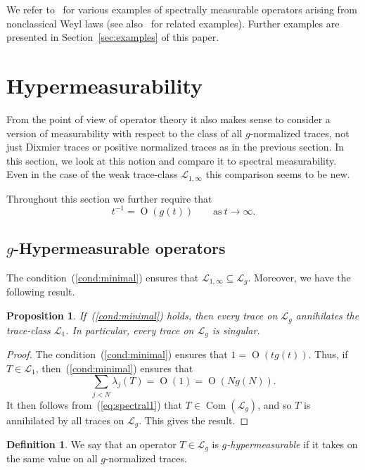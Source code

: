 \documentclass[10pt, a4paper]{amsart}
\newcommand{\sL}{\mathscr{L}}
\newcommand{\op}{\operatorname}
\newcommand{\Com}{\op{Com}}
\numberwithin{equation}{section}
\newtheorem{proposition}[theorem]{Proposition}
\theoremstyle{definition}
\newtheorem{definition}[theorem]{Definition}
\theoremstyle{remark}
\begin{document}
We refer to~\cite{PT:Part1} for various examples of spectrally measurable operators arising from nonclassical Weyl laws (see also~\cite{GS:JFA14, GU:JMAA20, LU:JMAA25, McD:arXiv26, TU:JMAA27} for related examples). Further examples are presented in Section~\ref{sec:examples} of this paper. 

\section{Hypermeasurability}\label{sec:hypermeasurability}
From the point of view of operator theory it also makes sense to consider a version of measurability with respect to the class of all $g$-normalized traces, not just Dixmier traces or positive normalized traces as in the previous section. In this section, we look at this notion and compare it to spectral measurability. Even in the case of the weak trace-class $\sL_{1,\infty}$ this comparison seems to be new.

Throughout this section we further require that
\begin{equation}\label{cond:minimal}
 t^{-1}=\op{O}\left(g(t)\right) \qquad \text{as}\ t\rightarrow \infty.
\end{equation}

\subsection{$g$-Hypermeasurable operators}
The condition~(\ref{cond:minimal}) ensures that $\sL_{1,\infty}\subseteq \sL_g$. Moreover, we have the following result.

\begin{proposition}\label{prop:Hyper.trace-singular}
 If~(\ref{cond:minimal}) holds, then every trace on $\sL_g$ annihilates the trace-class $\sL_1$. In particular, every trace on $\sL_g$ is singular.
\end{proposition}
\begin{proof}
The condition~(\ref{cond:minimal}) ensures that $1=\op{O}(tg(t))$. Thus, if $T\in \sL_1$, then~(\ref{cond:minimal}) ensures that
\begin{equation*}
 \sum_{j<N}\lambda_j(T) =\op{O}(1)=\op{O}(Ng(N)).
\end{equation*}
It then follows from~(\ref{eq:spectral1}) that $T\in \Com(\sL_g)$, and so $T$ is annihilated by all traces on $\sL_g$. This gives the result.
\end{proof}

\begin{definition}\label{def:hyper}
 We say that an operator $T\in \sL_g$ is \emph{$g$-hypermeasurable} if it takes on the same value on all $g$-normalized traces.
 \end{definition}
\end{document}
